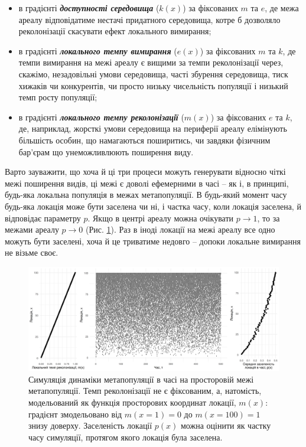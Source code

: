 \documentclass[
  11pt,
]{book}
\begin{document}
\begin{itemize}
\item
  в градієнті \textbf{\emph{доступності середовища}} (\(k(x)\)) за фіксованих \(m\) та \(e\), де межа ареалу відповідатиме нестачі придатного середовища, котре б дозволяло реколонізації скасувати ефект локального вимирання;
\item
  в градієнті \textbf{\emph{локального темпу вимирання}} (\(e(x)\)) за фіксованих \(m\) та \(k\), де темпи вимирання на межі ареалу є вищими за темпи реколонізації через, скажімо, незадовільні умови середовища, часті збурення середовища, тиск хижаків чи конкурентів, чи просто низьку чисельність популяції і низький темп росту популяції;
\item
  в градієнті \textbf{\emph{локального темпу реколонізації}} (\(m(x)\)) за фіксованих \(e\) та \(k\), де, наприклад, жорсткі умови середовища на периферії ареалу елімінують більшість особин, що намагаються поширитись, чи завдяки фізичним бар'єрам що унеможливлюють поширення виду.
\end{itemize}

Варто зауважити, що хоча й ці три процеси можуть генерувати відносно чіткі межі поширення видів, ці межі є доволі ефемерними в часі -- як і, в принципі, будь-яка локальна популяція в межах метапопуляції. В будь-який момент часу будь-яка локація може бути заселена чи ні, і частка часу, коли локація заселена, й відповідає параметру \(p\). Якщо в центрі ареалу можна очікувати \(p \rightarrow 1\), то за межами ареалу \(p \rightarrow 0\) (Рис. \ref{fig:fig-metapop-edge}). Раз в іноді локації на межі ареалу все одно можуть бути заселені, хоча й це триватиме недовго -- допоки локальне вимирання не візьме своє.

\begin{figure}

{\centering \includegraphics[width=100in]{images/metapop_edge} 

}

\caption{Симуляція динаміки метапопуляції в часі на просторовій межі метапопуляції. Темп реколонізації не є фіксованим, а, натомість, модельований як функція просторових координат локації, $m(x)$: градієнт змодельовано від $m(x=1) = 0$ до $m(x=100) = 1$ знизу доверху. Заселеність локації $p(x)$ можна оцінити як частку часу симуляції, протягом якого локація була заселена.}\label{fig:fig-metapop-edge}
\end{figure}
\end{document}
